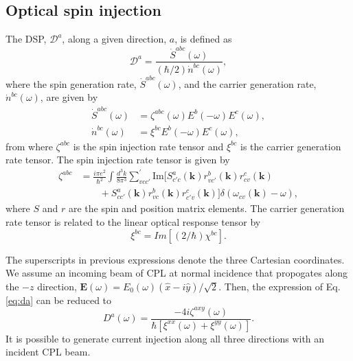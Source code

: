 \documentclass[pss]{wiley2sp} %
\begin{document}
\subsection{Optical spin injection}\label{sec:theory-DSP}

The DSP, $\mathcal{D}^{a}$, along a given direction, $a$, is defined as
\begin{equation}\label{eq:da}
\mathcal{D}^{a}=\frac{\dot{S}^{abc}(\omega)}{(\hbar/2)\dot{n}^{bc}(\omega)},
\end{equation}
where the spin generation rate, $\dot{S}^{abc}(\omega)$, and the carrier generation rate, $\dot{n}^{bc}(\omega)$,  are given by 
\begin{align*}
\dot{S}^{abc}(\omega) &= \zeta^{abc}(\omega)E^{b}(-\omega)E^{c}(\omega), \nonumber \\ 
\dot{n}^{bc}(\omega)  &= \xi^{bc}E^{b}(-\omega)E^{c}(\omega),
\end{align*}
from where $\zeta^{abc}$ is the spin injection rate tensor and $\xi^{bc}$ is the carrier generation rate tensor. The spin injection rate tensor is given by
\begin{align*}\label{eq:zeta}
\zeta^{abc} &= \frac{i\pi e^{2}}{\hbar^{2}}\int\frac{d^{3}k}{8\pi^{3}}
\sum_{vcc'}^{\prime}\text{Im}\bigl[S^{a}_{c'c}(\textbf{k})
r^{b}_{vc'}(\textbf{k})r^{c}_{cv}(\textbf{k})\nonumber\\
&\qquad+S^{a}_{cc'}(\textbf{k})
r^{b}_{vc}(\textbf{k})r^{c}_{c'v}(\textbf{k})\bigr]
\delta(\omega_{cv}(\textbf{k})-\omega),
\end{align*}
where $S$ and $r$ are the spin and position matrix elements. The carrier generation rate tensor is related to the linear optical response tensor by 
\begin{equation*}
\xi^{bc}=Im[(2/\hbar)\chi^{bc}].
\end{equation*}

The superscripts in previous expressions denote the three Cartesian coordinates. We assume an incoming beam of CPL at normal incidence that propogates along the $-z$ direction, $\mathbf{E}(\omega) = E_{0}(\omega)(\hat{x} - i\hat{y})/\sqrt{2}$. Then, the expression of Eq. \eqref{eq:da} can be reduced to
\begin{equation}\label{eq:D^i}
D^{a}(\omega) = 
\frac{-4i\zeta^{axy}(\omega)}
    {\hbar\left[\xi^{xx}(\omega) + \xi^{yy}(\omega)\right]}.
\end{equation}
It is possible to generate current injection along all three directions with
an incident CPL beam.
\end{document}
